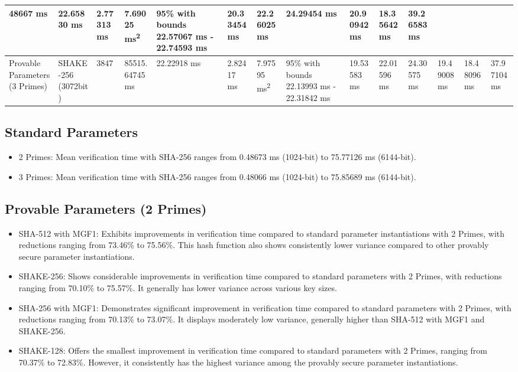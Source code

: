 \documentclass[]{final_report}
\theoremstyle{definition}
\begin{document}
\begin{landscape}
\begin{longtable}{|p{2.3cm}|p{1.8cm}|p{1.0cm}|p{1.7cm}|p{1.4cm}|p{1.5cm}|p{1.8cm}|p{1.5cm}|p{1.43cm}|p{1.5cm}|p{1.3cm}|p{1.4cm}|p{1.3cm}|p{1.37cm}|}
48667 ms & 22.65830 ms & 2.77313 ms & 7.69025 ms\textsuperscript{2} & 95\% with bounds 22.57067 ms - 22.74593 ms & 20.33454 ms & 22.26025 ms & 24.29454 ms & 20.90942 ms & 18.35642 ms & 39.26583 ms \\
\hline
Provable Parameters (3 Primes) & SHAKE-256 (3072bit) & 3847 & 85515.
64745 ms & 22.22918 ms & 2.82417 ms & 7.97595 ms\textsuperscript{2} & 95\% with bounds 22.13993 ms - 22.31842 ms & 19.53583 ms & 22.01596 ms & 24.30575 ms & 19.49008 ms & 18.48096 ms & 37.97104 ms \\
\hline


\end{longtable}


\end{landscape}



\subsection*{Standard Parameters}
\begin{itemize}
\item 2 Primes: Mean verification time with SHA-256 ranges from 0.48673 ms (1024-bit) to 75.77126 ms (6144-bit).
\item 3 Primes: Mean verification time with SHA-256 ranges from 0.48066 ms (1024-bit) to 75.85689 ms (6144-bit).
\end{itemize}

\subsection*{Provable Parameters (2 Primes)}
\begin{itemize}
\item SHA-512 with MGF1: Exhibits improvements in verification time compared to standard parameter instantiations with 2 Primes, with reductions ranging from 73.46\% to 75.56\%. This hash function also shows consistently lower variance compared to other provably secure parameter instantiations.
\item SHAKE-256: Shows considerable improvements in verification time compared to standard parameters with 2 Primes, with reductions ranging from 70.10\% to 75.57\%. It generally has lower variance across various key sizes.
\item SHA-256 with MGF1: Demonstrates significant improvement in verification time compared to standard parameters with 2 Primes, with reductions ranging from 70.13\% to 73.07\%. It displays moderately low variance, generally higher than SHA-512 with MGF1 and SHAKE-256.
\item SHAKE-128: Offers the smallest improvement in verification time compared to standard parameters with 2 Primes, ranging from 70.37\% to 72.83\%. However, it consistently has the highest variance among the provably secure parameter instantiations.
\end{itemize}
\end{document}
